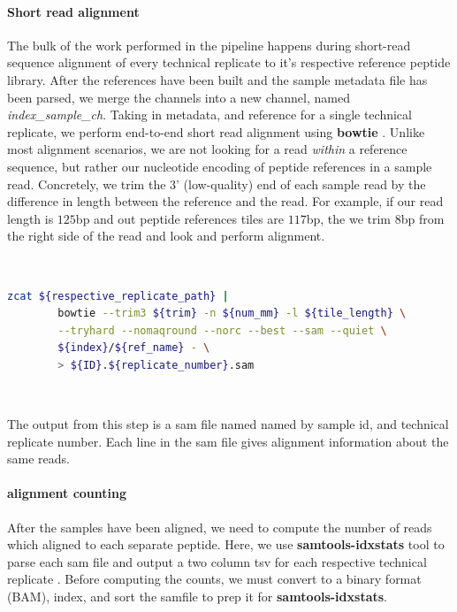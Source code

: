 \documentclass{article}
\begin{document}
\paragraph{Short read alignment}
The bulk of the work performed in the pipeline happens during short-read sequence alignment of every technical replicate to it's respective reference peptide library.
After the references have been built and the sample metadata file has been parsed, we merge the channels into a new channel, named \textit{index\_sample\_ch}.
Taking in metadata, and reference for a single technical replicate, we perform end-to-end short read alignment using \textbf{bowtie} \cite{Langmead2009}.
Unlike most alignment scenarios, we are not looking for a read \textit{within} a reference sequence, but rather our nucleotide encoding of peptide references in a sample read.
Concretely, we trim the 3' (low-quality) end of each sample read by the difference in length between the reference and the read.
For example, if our read length is $125$bp and out peptide references tiles are $117$bp, the we trim $8$bp from the right side of the read and look and perform alignment.

~

\begin{lstlisting}[language=bash,caption={bash version}, caption={Short-read alignment parameters},captionpos=b,numbers=none,label=listing:alignment.bash]
        zcat ${respective_replicate_path} |
        bowtie --trim3 ${trim} -n ${num_mm} -l ${tile_length} \
        --tryhard --nomaqround --norc --best --sam --quiet \
        ${index}/${ref_name} - \
        > ${ID}.${replicate_number}.sam
\end{lstlisting}

~

The output from this step is a sam file named named by sample id, and technical replicate number. 
Each line in the sam file gives alignment information about the same reads.

\paragraph{alignment counting}
After the samples have been aligned, we need to compute the number of reads which aligned to each separate peptide. 
Here, we use \textbf{samtools-idxstats} tool to parse each sam file and output a two column tsv for each respective technical replicate \cite{Li2009}.
Before computing the counts, we must convert to a binary format (BAM), index, and sort the samfile to prep it for \textbf{samtools-idxstats}.
\end{document}
